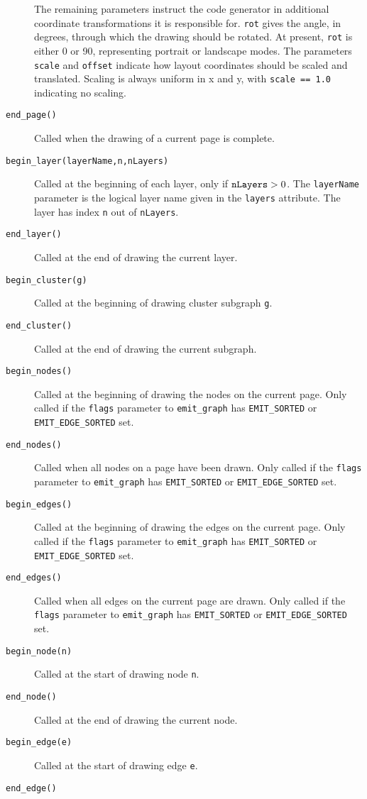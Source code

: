 \begin{description}
The remaining parameters instruct the code generator in additional
coordinate transformations it is responsible for. {\tt rot} gives
the angle, in degrees, through which the drawing should be rotated. At present,
{\tt rot} is either 0 or 90, representing portrait or landscape modes.
The parameters {\tt scale} and {\tt offset} indicate how layout
coordinates should be scaled and translated. Scaling is always uniform
in x and y, with {\tt scale == 1.0} indicating no scaling.
\item[{\tt end\_page()}] 
Called when the drawing of a current page is complete.
\item[{\tt begin\_layer(layerName,n,nLayers)}]
Called at the beginning of each layer, only if ${\tt nLayers} > 0$.
The {\tt layerName} parameter is the logical layer name given in
the {\tt layers} attribute. The layer has index {\tt n} out of
{\tt nLayers}.
\item[{\tt end\_layer()}] 
Called at the end of drawing the current layer.
\item[{\tt begin\_cluster(g)}]
Called at the beginning of drawing cluster subgraph {\tt g}.
\item[{\tt end\_cluster()}]
Called at the end of drawing the current subgraph.
\item[{\tt begin\_nodes()}]
Called at the beginning of drawing the nodes on the current page.
Only called if the {\tt flags} parameter to {\tt emit\_graph} has
{\tt EMIT\_SORTED} or {\tt EMIT\_EDGE\_SORTED} set.
\item[{\tt end\_nodes()}]
Called when all nodes on a page have been drawn.
Only called if the {\tt flags} parameter to {\tt emit\_graph} has
{\tt EMIT\_SORTED} or {\tt EMIT\_EDGE\_SORTED} set.
\item[{\tt begin\_edges()}]
Called at the beginning of drawing the edges on the current page.
Only called if the {\tt flags} parameter to {\tt emit\_graph} has
{\tt EMIT\_SORTED} or {\tt EMIT\_EDGE\_SORTED} set.
\item[{\tt end\_edges()}]
Called when all edges on the current page are drawn.
Only called if the {\tt flags} parameter to {\tt emit\_graph} has
{\tt EMIT\_SORTED} or {\tt EMIT\_EDGE\_SORTED} set.
\item[{\tt begin\_node(n)}]
Called at the start of drawing node {\tt n}.
\item[{\tt end\_node()}]
Called at the end of drawing the current node.
\item[{\tt begin\_edge(e)}]
Called at the start of drawing edge {\tt e}.
\item[{\tt end\_edge()}]

\end{description}
